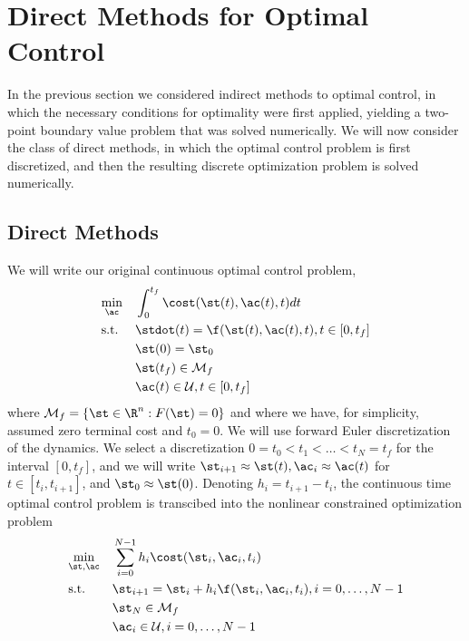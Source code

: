 \chapter{Direct Methods for Optimal Control}

In the previous section we considered indirect methods to optimal control, in which the necessary conditions for optimality were first applied, yielding a two-point boundary value problem that was solved numerically. We will now consider the class of direct methods, in which the optimal control problem is first discretized, and then the resulting discrete optimization problem is solved numerically. 

\section{Direct Methods}

We will write our original continuous optimal control problem,
\begin{equation}
\begin{aligned}
\label{eq:ocp}
& \underset{\ac}{\min} & & \int_0^{t_f} \cost(\st(t),\ac(t),t) dt \\
& \textrm{s.t.} & & \stdot(t) = \f(\st(t), \ac(t),t), t \in [0, t_f]\\
& & & \st(0) = \st_0\\
& & & \st(t_f) \in \mathcal{M}_f\\
& & & \ac(t) \in \mathcal{U}, t\in [0,t_f]
\end{aligned}
\end{equation}
where $\mathcal{M}_f = \{\st\in \R^n : F(\st) = 0\}$ and where we have, for simplicity, assumed zero terminal cost and $t_0 = 0$. We will use forward Euler discretization of the dynamics. We select a discretization $0 = t_0 < t_1 < \ldots < t_N = t_f$ for the interval $[0,t_f]$, and we will write $\st_{i+1} \approx \st(t), \ac_i \approx \ac(t)$ for $t \in [t_i, t_{i+1}]$, and $\st_0 \approx \st(0)$. Denoting $h_i = t_{i+1} - t_i$, the continuous time optimal control problem is transcibed into the nonlinear constrained optimization problem 
\begin{equation}
\begin{aligned}
\label{eq:nlop}
& \underset{\st,\ac}{\min} & & \sum_{i=0}^{N-1} h_i \cost(\st_i,\ac_i,t_i) \\
& \textrm{s.t.} & & \st_{i+1} = \st_i + h_i \f(\st_i,\ac_i,t_i), i = 0, \ldots, N-1\\
& & & \st_N \in \mathcal{M}_f\\
& & & \ac_i \in \mathcal{U}, i = 0, \ldots, N-1
\end{aligned}
\end{equation}

